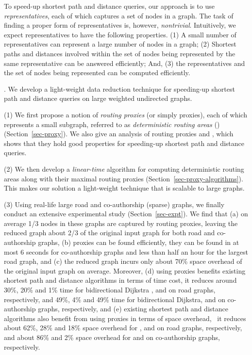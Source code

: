 To speed-up shortest  path and distance queries, our approach is to use {\em representatives}, each of which captures a set of nodes in a graph. The task of finding a proper form of representatives is, however, {\em nontrivial}. Intuitively, we expect representatives to have the following properties.
%
(1) A small number of representatives can represent a large number of nodes in a graph;
%
(2) Shortest paths and distances involved within the set of nodes being represented by the same representative can be answered efficiently; And,
%
(3) the representatives and the set of nodes being represented can be computed efficiently.


. We develop a light-weight data reduction technique for speeding-up shortest  path and distance queries on large weighted undirected graphs.

\stab (1) We first propose a notion of {\em routing proxies} (or simply proxies), each of which represents a small subgraph, referred to as  {\em deterministic routing areas} (\dras)  (Section~\ref{sec-proxy}). We also give an analysis of routing proxies and \dras, which shows that they hold good properties for speeding-up shortest path and distance queries.

\stab (2) We then develop a {\em linear-time} algorithm for computing deterministic routing areas along with their maximal routing proxies (Section~\ref{sec-proxy-algorithms}). This makes our solution a light-weight technique that is scalable to large graphs.


\stab (3) Using real-life large road and co-authorship (sparse) graphs, we finally conduct an extensive experimental study (Section~\ref{sec-expt}).
We find that (a) on average 1/3 nodes in these graphs are captured by routing proxies, leaving the reduced graph about 2/3 of the original input graph for both road and co-authorship graphs,  (b) proxies can be found efficiently, \eg they can be found in at most 6 seconds for co-authorship graphs and less than half an hour for the largest road graph, and (c) the reduced graph incurs only about 70\% space overhead of the original input graph on average.  Moreover, (d) using proxies benefits existing shortest path and distance algorithms in terms of time cost, \eg it reduces around 30\%, 20\% and 1\% time for  bidirectional Dijkstra \cite{LubyR89}, \arcflag \cite{MohringSSWW05} and \ah \cite{zhu2013shortest} on road graphs, respectively, and 49\%, 4\% and 49\% time for bidirectional Dijkstra, \arcflag and \tnr \cite{arz2013transit} on co-authorship graphs, respectively, %
and (e) existing shortest path and distance algorithms also benefit from using proxies in terms of space overhead, \eg\ it reduces about 62\%, 28\% and 18\% space overhead for \arcflag, \tnr and \ah on road graphs, respectively, and about 86\% and 2\% space overhead for \arcflag and \tnr on co-authorship graphs, respectively.

